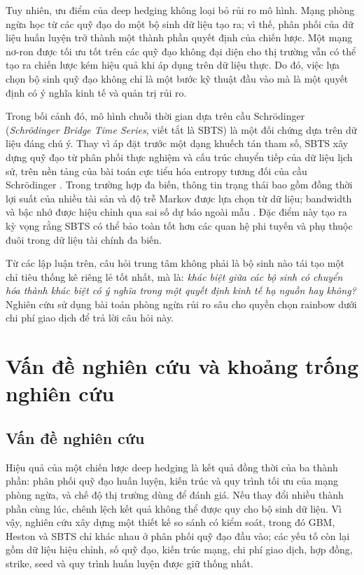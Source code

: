 Tuy nhiên, ưu điểm của deep hedging không loại bỏ rủi ro mô hình. Mạng phòng
ngừa học từ các quỹ đạo do một bộ sinh dữ liệu tạo ra; vì thế, phân phối của
dữ liệu huấn luyện trở thành một thành phần quyết định của chiến lược. Một
mạng nơ-ron được tối ưu tốt trên các quỹ đạo không đại diện cho thị trường vẫn
có thể tạo ra chiến lược kém hiệu quả khi áp dụng trên dữ liệu thực. Do đó,
việc lựa chọn bộ sinh quỹ đạo không chỉ là một bước kỹ thuật đầu vào mà là một
quyết định có ý nghĩa kinh tế và quản trị rủi ro.

Trong bối cảnh đó, mô hình chuỗi thời gian dựa trên cầu Schrödinger
(\textit{Schrödinger Bridge Time Series}, viết tắt là \textsc{SBTS}) là một
đối chứng dựa trên dữ liệu đáng chú ý. Thay vì áp đặt trước một dạng khuếch tán
tham số, \textsc{SBTS} xây dựng quỹ đạo từ phân phối thực nghiệm và cấu trúc
chuyển tiếp của dữ liệu lịch sử, trên nền tảng của bài toán cực tiểu hóa entropy
tương đối của cầu Schrödinger \parencite{Hamdouche2023}. Trong trường hợp đa
biến, thông tin trạng thái bao gồm đồng thời lợi suất của nhiều tài sản và độ
trễ Markov được lựa chọn từ dữ liệu; bandwidth và bậc nhớ được hiệu chỉnh qua
sai số dự báo ngoài mẫu \parencite{Alouadi2025}. Đặc điểm này tạo ra kỳ vọng
rằng \textsc{SBTS} có thể bảo toàn tốt hơn các quan hệ phi tuyến và phụ thuộc
đuôi trong dữ liệu tài chính đa biến.

Từ các lập luận trên, câu hỏi trung tâm không phải là bộ sinh nào tái tạo một
chỉ tiêu thống kê riêng lẻ tốt nhất, mà là: \emph{khác biệt giữa các bộ sinh có
chuyển hóa thành khác biệt có ý nghĩa trong một quyết định kinh tế hạ nguồn hay
không?} Nghiên cứu sử dụng bài toán phòng ngừa rủi ro sâu cho quyền chọn rainbow
dưới chi phí giao dịch để trả lời câu hỏi này.

\section{Vấn đề nghiên cứu và khoảng trống nghiên cứu}
\label{sec:van-de-khoang-trong}

\subsection{Vấn đề nghiên cứu}
\label{subsec:van-de-nghien-cuu}

Hiệu quả của một chiến lược deep hedging là kết quả đồng thời của ba thành
phần: phân phối quỹ đạo huấn luyện, kiến trúc và quy trình tối ưu của mạng
phòng ngừa, và chế độ thị trường dùng để đánh giá. Nếu thay đổi nhiều thành
phần cùng lúc, chênh lệch kết quả không thể được quy cho bộ sinh dữ liệu. Vì
vậy, nghiên cứu xây dựng một thiết kế so sánh có kiểm soát, trong đó
\textsc{GBM}, Heston và \textsc{SBTS} chỉ khác nhau ở phân phối quỹ đạo đầu
vào; các yếu tố còn lại gồm dữ liệu hiệu chỉnh, số quỹ đạo, kiến trúc mạng,
chi phí giao dịch, hợp đồng, strike, seed và quy trình huấn luyện được giữ
thống nhất.

